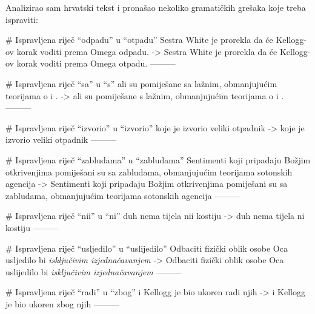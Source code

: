 Analizirao sam hrvatski tekst i pronašao nekoliko gramatičkih grešaka koje treba ispraviti:

# Ispravljena riječ “odpadu” u “otpadu”
Sestra White je prorekla da će Kellogg-ov korak voditi prema Omega odpadu.
->
Sestra White je prorekla da će Kellogg-ov korak voditi prema Omega otpadu.
---------

# Ispravljena riječ “sa” u “s”
ali su pomiješane sa lažnim, obmanjujućim teorijama o  i .
->
ali su pomiješane s lažnim, obmanjujućim teorijama o  i .
---------

# Ispravljena riječ “izvorio” u “izvorio”
koje je izvorio veliki otpadnik
->
koje je izvorio veliki otpadnik
---------

# Ispravljena riječ “zabludama” u “zabludama”
Sentimenti koji pripadaju Božjim otkrivenjima pomiješani su sa zabludama, obmanjujućim teorijama sotonskih agencija
->
Sentimenti koji pripadaju Božjim otkrivenjima pomiješani su sa zabludama, obmanjujućim teorijama sotonskih agencija
---------

# Ispravljena riječ “nii” u “ni”
duh nema tijela nii kostiju
->
duh nema tijela ni kostiju
---------

# Ispravljena riječ “usljedilo” u “uslijedilo”
Odbaciti fizički oblik osobe Oca usljedilo bi \textit{isključivim izjednačavanjem}
->
Odbaciti fizički oblik osobe Oca uslijedilo bi \textit{isključivim izjednačavanjem}
---------

# Ispravljena riječ “radi” u “zbog”
i Kellogg je bio ukoren radi njih
->
i Kellogg je bio ukoren zbog njih
---------